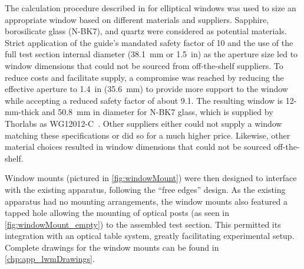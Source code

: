             The calculation procedure described in \cite{brookhavennationallaboratoryGuideGlassPlastic2005} for elliptical windows was used to size an appropriate window based on different materials and suppliers. Sapphire, borosilicate glass (N-BK7), and quartz were considered as potential materials. Strict application of the guide's mandated safety factor of 10 and the use of the full test section internal diameter (\qty{38.1}{mm} or 1.5~in) as the aperture size led to window dimensions that could not be sourced from off-the-shelf suppliers. To reduce costs and facilitate supply, a compromise was reached by reducing the effective aperture to 1.4~in (\qty{35.6}{mm}) to provide more support to the window while accepting a reduced safety factor of about 9.1. The resulting window is 12-mm-thick and \qty{50.8}{mm} in diameter for N-BK7 glass, which is supplied by Thorlabs as WG12012-C~\cite{thorlabsWG12012CO2NBK7}. Other suppliers either could not supply a window matching these specifications or did so for a much higher price. Likewise, other material choices resulted in window dimensions that could not be sourced off-the-shelf.

            Window mounts (pictured in \autoref{fig:windowMount}) were then designed to interface with the existing apparatus, following the ``free edges'' design. As the existing apparatus had no mounting arrangements, the window mounts also featured a tapped hole allowing the mounting of optical posts (as seen in \autoref{fig:windowMount_empty}) to the assembled test section. This permitted its integration with an optical table system, greatly facilitating experimental setup. Complete drawings for the window mounts can be found in \autoref{chp:app_lwmDrawings}.


